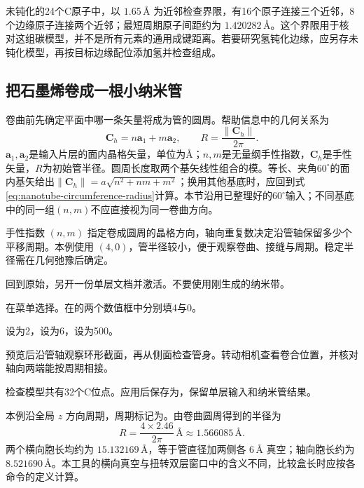 未钝化的24个C原子中，以 $1.65\,\text{\AA}$ 为近邻检查界限，有16个原子连接三个近邻，8个边缘原子连接两个近邻；最短周期原子间距约为 $1.420282\,\text{\AA}$。这个界限用于核对这组碳模型，并不是所有元素的通用成键距离。若要研究氢钝化边缘，应另存未钝化模型，再按目标边缘配位添加氢并检查组成。

\subsection{把石墨烯卷成一根小纳米管}

卷曲前先确定平面中哪一条矢量将成为管的圆周。帮助信息中的几何关系为
\begin{equation}
  \mathbf C_h=n\mathbf a_1+m\mathbf a_2,
  \qquad R=\frac{\|\mathbf C_h\|}{2\pi}.
  \label{eq:nanotube-circumference-radius}
\end{equation}
$\mathbf a_1,\mathbf a_2$是输入片层的面内晶格矢量，单位为\AA；$n,m$是无量纲手性指数，$\mathbf C_h$是手性矢量，$R$为初始管半径。圆周长度取两个基矢线性组合的模。等长、夹角$60^\circ$的面内基矢给出$\|\mathbf C_h\|=a\sqrt{n^2+nm+m^2}$；换用其他基底时，应回到式\eqref{eq:nanotube-circumference-radius}计算。本节沿用已整理好的$60^\circ$输入；不同基底中的同一组$(n,m)$不应直接视为同一卷曲方向。



手性指数 $(n,m)$ 指定卷成圆周的晶格方向，轴向重复数决定沿管轴保留多少个平移周期。本例使用 $(4,0)$，管半径较小，便于观察卷曲、接缝与周期。稳定半径需在几何弛豫后确定。

\begin{steps}
  \item 回到原始，另开一份单层文档并激活。不要使用刚生成的纳米带。
  \item 在菜单选择。在的两个数值框中分别填4与0。
  \item {}设为2，设为6，设为500。
  \item 预览后沿管轴观察环形截面，再从侧面检查管身。转动相机查看卷合位置，并核对轴向两端能按周期相接。
  \item 检查模型共有32个C位点。应用后保存为，保留单层输入和纳米管结果。
\end{steps}

本例沿全局 $z$ 方向周期，周期标记为。由卷曲圆周得到的半径为
\[
 R=\frac{4\times2.46}{2\pi}\,\text{\AA}\approx1.566085\,\text{\AA}.
\]
两个横向胞长均约为 $15.132169\,\text{\AA}$，等于管直径加两侧各 $6\,\text{\AA}$ 真空；轴向胞长约为 $8.521690\,\text{\AA}$。本工具的横向真空与扭转双层窗口中的含义不同，比较盒长时应按各命令的定义计算。

